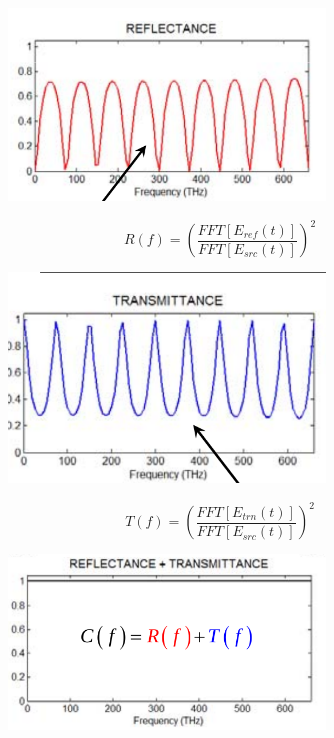 \documentclass[a4paper,10pt]{article}
\begin{document}
\begin{figure}[ht]
   \centering
     \includegraphics[width=0.75\textwidth]{ReflectanceNorm.png}
\end{figure}

\begin{equation}
 R(f) = \left(\frac{FFT[E_{ref}(t)]}{FFT[E_{src}(t)]}\right)^2
\end{equation}



\begin{figure}[ht]
   \centering
     \includegraphics[width=0.75\textwidth]{TransmittanceNorm.png}
\end{figure}

\begin{equation}
 T(f) = \left(\frac{FFT[E_{trn}(t)]}{FFT[E_{src}(t)]}\right)^2
\end{equation}


\begin{figure}[ht]
   \centering
     \includegraphics[width=0.75\textwidth]{ConservationNorm.png}
\end{figure}
\end{document}
